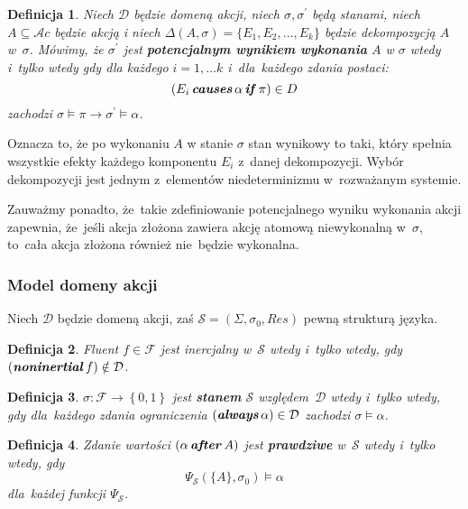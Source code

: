 \documentclass[11pt,a4paper]{article}
\newtheorem{defn}{Definicja}
\DeclareMathOperator{\After}{\textbf{\textit{after}}}
\DeclareMathOperator{\Causes}{\textbf{\textit{causes}}}
\DeclareMathOperator{\If}{\textbf{\textit{if}}}
\DeclareMathOperator{\Always}{\textbf{\textit{always}}}
\DeclareMathOperator{\Noninertial}{\textbf{\textit{noninertial}}}
\begin{document}
\begin{defn}
    Niech $\mathcal{D}$ będzie domeną akcji, niech $\sigma, \sigma^\prime$ będą stanami, niech $A \subseteq \mathcal{A}c$ będzie akcją i niech $\Delta(A, \sigma) = \{ E_1, E_2, \dots, E_k \}$ będzie dekompozycją $A$ w~$\sigma$.
    Mówimy, że $\sigma^\prime$ jest \textbf{potencjalnym wynikiem wykonania} $A$ w $\sigma$ wtedy i~tylko wtedy gdy dla każdego $i = 1, \dots k$ i~dla~każdego zdania postaci: 
    $$ (E_i \Causes \alpha \If \pi) \in D $$
    zachodzi $\sigma \models \pi \rightarrow \sigma^\prime \models \alpha $.
\end{defn} 
    
Oznacza to, że po wykonaniu $A$ w stanie $\sigma$ stan wynikowy to taki, który spełnia wszystkie efekty każdego komponentu $E_i$ z~danej dekompozycji.
Wybór dekompozycji jest jednym z~elementów niedeterminizmu w~rozważanym systemie.

Zauważmy ponadto, że~takie zdefiniowanie potencjalnego wyniku wykonania akcji zapewnia, że~jeśli akcja złożona zawiera akcję atomową niewykonalną w~$\sigma$, to~cała akcja złożona również nie~będzie wykonalna.

\subsubsection{Model domeny akcji}

Niech $\mathcal{D}$ będzie domeną akcji, zaś $\mathcal{S} = \left(\Sigma, \sigma_0, Res\right)$ pewną strukturą języka.

\begin{defn}
    Fluent $f \in \mathcal{F}$ jest inercjalny w~$\mathcal{S}$ wtedy i~tylko wtedy, gdy $\left(\Noninertial f\right) \notin \mathcal{D}$.
\end{defn}

\begin{defn}
    $\sigma : \mathcal{F} \rightarrow \left\{0,1\right\}$ jest \textbf{stanem} $\mathcal{S}$ względem~$\mathcal{D}$ wtedy i~tylko wtedy, gdy dla~każdego zdania ograniczenia $\left(\Always \alpha\right) \in \mathcal{D}$ zachodzi $\sigma \models \alpha$.
\end{defn}

\begin{defn}
    Zdanie wartości $(\alpha \After A)$ jest \textbf{prawdziwe} w~$\mathcal{S}$ wtedy i~tylko wtedy, gdy
    $$\Psi_{\mathcal{S}}(\{ A \}, \sigma_0) \models \alpha$$
    dla~każdej funkcji $\Psi_{\mathcal{S}}$.
\end{defn}
\end{document}
